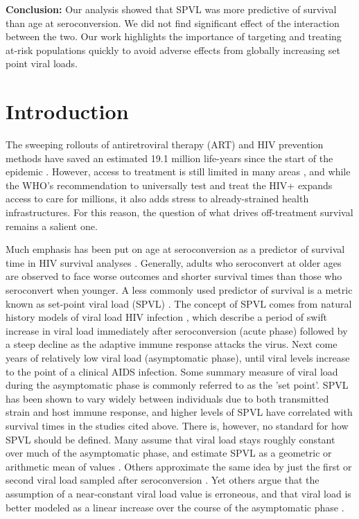 \documentclass[12pt, titlepage, proquest]{article}
\begin{document}
\textbf{Conclusion:} Our analysis showed that SPVL was more predictive of survival than age at seroconversion. We did not find significant effect of the interaction between the two. Our work highlights the importance of targeting and treating at-risk populations quickly to avoid adverse effects from globally increasing set point viral loads.

\newpage


\section{Introduction}

The sweeping rollouts of antiretroviral therapy (ART) and HIV prevention methods have saved an estimated 19.1 million life-years since the start of the epidemic \cite{murray_global_2014}. However, access to treatment is still limited in many areas \cite{unaids_access_2013}, and while the WHO's recommendation to universally test and treat the HIV+ expands access to care for millions, it also adds stress to already-strained health infrastructures. For this reason, the question of what drives off-treatment survival remains a salient one. 

Much emphasis has been put on age at seroconversion as a predictor of survival time in HIV survival analyses \cite{asher_characteristics_2016, todd_time_2007, babiker_age_2001, _time_2000, davis_early_2013,han_hiv_2015,justice_predictive_2013,legarth_long-term_2016,poorolajal_predictors_2015}. Generally, adults who seroconvert at older ages are observed to face worse outcomes and shorter survival times than those who seroconvert when younger. A less commonly used predictor of survival is a metric known as set-point viral load (SPVL) \cite{sterling_initial_2001,de_wolf_aids_1997,pantazis_bivariate_2005,lavreys_higher_2006,chirouze_viremia_2015,arnaout_simple_1999}. The concept of SPVL comes from natural history models of viral load HIV infection \cite{an_host_2010}, which describe a period of swift increase in viral load immediately after seroconversion (acute phase) followed by a steep decline as the adaptive immune response attacks the virus. Next come years of relatively low viral load (asymptomatic phase), until viral levels increase to the point of a clinical AIDS infection. Some summary measure of viral load during the asymptomatic phase is commonly referred to as the 'set point'. SPVL has been shown to vary widely between individuals due to both transmitted strain and host immune response\cite{fraser_variation_2007}, and higher levels of SPVL have correlated with survival times in the studies cited above. There is, however, no standard for how SPVL should be defined. Many assume that viral load stays roughly constant over much of the asymptomatic phase, and estimate SPVL as a geometric or arithmetic mean of values \cite{fraser_variation_2007,arnaout_simple_1999}. Others approximate the same idea by just the first or second viral load sampled after seroconversion \cite{lavreys_higher_2006}. Yet others argue that the assumption of a near-constant viral load value is erroneous, and that viral load is better modeled as a linear increase over the course of the asymptomatic phase \cite{vidal_lack_1998}. 
\end{document}
